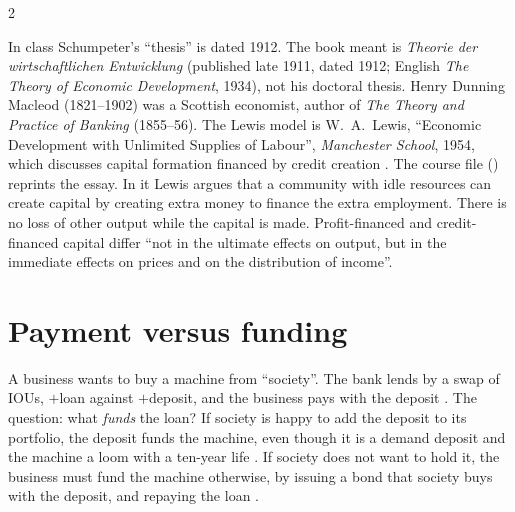 \begin{paracol}{2}
\begin{coursenote}
In class Schumpeter's ``thesis'' is dated 1912. The book meant is \emph{Theorie der wirtschaftlichen Entwicklung} (published late 1911, dated 1912; English
\emph{The Theory of Economic Development}, 1934), not his doctoral thesis. Henry Dunning Macleod (1821--1902) was a Scottish economist, author of \emph{The Theory
and Practice of Banking} (1855--56). The Lewis model is W.~A.~Lewis, ``Economic Development with Unlimited Supplies of Labour'', \emph{Manchester School}, 1954,
which discusses capital formation financed by credit creation . The course file () reprints the essay. In it Lewis argues that a community with idle resources can create capital by creating extra money to finance the extra employment. There is no loss of other output while the capital is made. Profit-financed and credit-financed capital differ ``not in the ultimate effects on output, but in the immediate effects on prices and on the distribution of income''.
\end{coursenote}

\section{Payment versus funding}\label{sec:di-payment}

A business wants to buy a machine from ``society''. The bank lends by a swap of IOUs, $+$loan against $+$deposit, and the business pays with the deposit
. The question: what \emph{funds} the loan? If society is happy to add the
deposit to its portfolio, the deposit funds the machine, even though it is a demand deposit and the machine a loom with a ten-year life
. If society does not want to hold it, the business must fund the machine otherwise, by issuing a bond that
society buys with the deposit, and repaying the loan .

\begin{nfigure}
\begin{taccts}
\quad
{}\quad
{}
\end{taccts}
\caption{Payment versus funding: bank credit as a bridge loan, the bond as take-out financing .}\label{fig:di-payment}
\end{nfigure}


\end{paracol}
